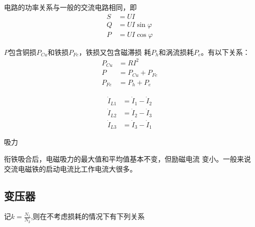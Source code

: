 电路的功率关系与一般的交流电路相同，即
\begin{equation}
    \begin{aligned}
        S &=UI \\
        Q &=UI\sin \varphi \\
        P &=UI\cos \varphi    
    \end{aligned}
\end{equation}

$P$包含铜损$P_{Cu}$和铁损$P_{Fe}$，铁损又包含磁滞损
耗$P_h$和涡流损耗$P_e$。有以下关系：
\begin{equation}
    \begin{aligned}
        P_{Cu} &= RI^2 \\
        P &= P_{Cu}+P_{Fe} \\
        P_{Fe} &= P_h+P_e
    \end{aligned}
\end{equation}

\begin{equation}
    \begin{aligned}
        \dot{I}_{L1} &= \dot{I}_{1} - \dot{I}_{2} \\
        \dot{I}_{L2} &= \dot{I}_{2} - \dot{I}_{3} \\
        \dot{I}_{L3} &= \dot{I}_{3} - \dot{I}_{1}
    \end{aligned}
\end{equation}

\noindent 吸力

衔铁吸合后，电磁吸力的最大值和平均值基本不变，但励磁电流
变小。一般来说交流电磁铁的启动电流比工作电流大很多。

\subsection{变压器}
\begin{center}
    记$k=\frac{N_1}{N_2}$,则在不考虑损耗的情况下有下列关系
\end{center}

\begin{table}[!htbp]
    \centering
\end{table}